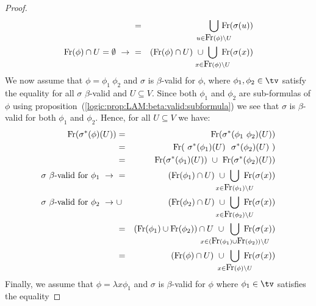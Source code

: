 \begin{proof}
\begin{eqnarray*}
        &=&
        \!\!\!\!\!\!\!\!
        \bigcup_{u\in\free(\phi)\setminus U} 
        \!\!\!\!\!\!\!\!
        \free(\sigma(u))\\
        \mbox{$\free(\phi)\cap U = \emptyset\ \rightarrow\ $} 
        &=& 
        (\free(\phi)\cap U)
        \ \cup
        \!\!\!\!\!\!\!
        \bigcup_{x\in\free(\phi)\setminus U} 
        \!\!\!\!\!\!\!
        \free(\sigma(x))
    \end{eqnarray*}
    We now assume that $\phi=\phi_{1}\ \phi_{2}$ and $\sigma$ is $\beta$-valid 
    for $\phi$, where $\phi_{1}, \phi_{2}\in\tv$ satisfy the equality for all 
    $\sigma$ $\beta$-valid and $U\subseteq V$. Since both $\phi_{1}$ and 
    $\phi_{2}$ are sub-formulas of $\phi$ using  
    proposition~(\ref{logic:prop:LAM:beta:valid:subformula}) we see that 
    $\sigma$ is $\beta$-valid for both $\phi_{1}$ and $\phi_{2}$. Hence, for 
    all $U\subseteq V$ we have:
    \begin{eqnarray*}
        \free(\sigma^{*}(\phi)(U))
        &=&\free(\sigma^{*}(\phi_{1}\ \phi_{2})(U))\\
        &=&\free(\ \sigma^{*}(\phi_{1})(U)\ \ \sigma^{*}(\phi_{2})(U)\ )\\
        &=&\free(\sigma^{*}(\phi_{1})(U))\ \cup\ \free(\sigma^{*}(\phi_{2})(U))\\
        \mbox{$\sigma$ $\beta$-valid for $\phi_{1}\ \rightarrow\ $}
        &=&(\free(\phi_{1})\cap U)
        \ \cup\ 
        \!\!\!\!\!\!\!\!\!\!
        \bigcup_{x\in\free(\phi_{1})\setminus U} 
        \!\!\!\!\!\!\!\!
        \free(\sigma(x))\\
        \mbox{$\sigma$ $\beta$-valid for $\phi_{2}\ \rightarrow\ $}
        &\cup&(\free(\phi_{2})\cap U)
        \ \cup\ 
        \!\!\!\!\!\!\!\!\!\!
        \bigcup_{x\in\free(\phi_{2})\setminus U} 
        \!\!\!\!\!\!\!\!
        \free(\sigma(x))\\
        &=&(\free(\phi_{1})\cup\free(\phi_{2}))\cap U
        \ \cup\ 
        \!\!\!\!\!\!\!\!\!\!\!\!\!\!\!\!\!\!\!\!
        \bigcup_{x\in(\free(\phi_{1})\cup\free(\phi_{2}))\setminus U}
        \!\!\!\!\!\!\!\!\!\!\!\!\!\!\!\!\!\!\!
        \free(\sigma(x))\\
        &=&(\free(\phi)\cap U)\ \cup\ 
        \!\!\!\!\!\!\!\!
        \bigcup_{x\in\free(\phi)\setminus U}
        \!\!\!\!\!\!\!
        \free(\sigma(x))
    \end{eqnarray*}
    Finally, we assume that $\phi=\lambda x\phi_{1}$ and $\sigma$ is 
    $\beta$-valid for $\phi$ where $\phi_{1}\in\tv$ satisfies the equality 

\end{proof}
